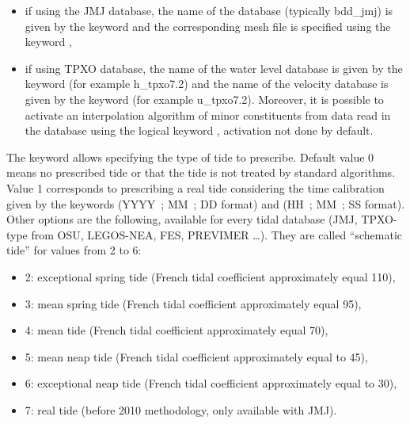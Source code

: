 \begin{itemize}
\item if using the JMJ database, the name of the database (typically bdd\_jmj)
is given by the keyword  and the corresponding
mesh file is specified using the keyword ,

\item if using TPXO database, the name of the water level database is given
by the keyword  (for example h\_tpxo7.2)
and the name of the velocity database is given by the keyword
 (for example u\_tpxo7.2).
Moreover, it is possible to activate an interpolation algorithm of minor
constituents from data read in the database using the logical keyword
, activation not done by default.
\end{itemize}

The keyword  allows specifying
the type of tide to prescribe.
Default value 0 means no prescribed tide or that the tide is not treated by
standard algorithms.
Value 1 corresponds to prescribing a real tide considering the time calibration
given by the keywords  (YYYY~; MM~; DD format) and
 (HH~; MM~; SS format).
Other options are the following, available for every tidal database (JMJ,
TPXO-type from OSU, LEGOS-NEA, FES, PREVIMER \ldots).
They are called “schematic tide” for values from 2 to 6:

\begin{itemize}
\item 2: exceptional spring tide (French tidal coefficient
 approximately equal 110),

\item 3: mean spring tide (French tidal coefficient approximately
 equal 95),

\item 4: mean tide (French tidal coefficient approximately equal 70),

\item 5: mean neap tide (French tidal coefficient approximately
equal to 45),

\item 6: exceptional neap tide (French tidal coefficient
approximately equal to 30),

\item 7: real tide (before 2010 methodology, only available
with JMJ).
\end{itemize}

